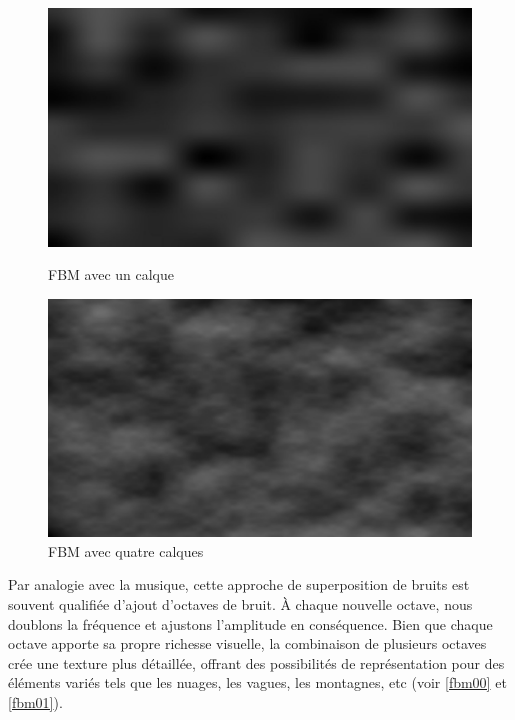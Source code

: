 \begin{figure}[h]
  \begin{minipage}[b]{0.45\linewidth}
    \centering
    \includegraphics[width=\linewidth]{images/noise/noise09.JPG}
    \caption{FBM avec un calque}
    \label{noise09}
  \end{minipage}
  \hspace{0.1\linewidth} %
  \begin{minipage}[b]{0.45\linewidth}
    \centering
    \includegraphics[width=\linewidth]{images/noise/noise08.JPG}
    \caption{FBM avec quatre calques}
    \label{noise08}
  \end{minipage}
\end{figure}


Par analogie avec la musique, cette approche de superposition de bruits est souvent qualifiée d'ajout d'octaves de bruit. À chaque nouvelle octave, nous doublons la fréquence et ajustons l'amplitude en conséquence. Bien que chaque octave apporte sa propre richesse visuelle, la combinaison de plusieurs octaves crée une texture plus détaillée, offrant des possibilités de représentation pour des éléments variés tels que les nuages, les vagues, les montagnes, etc (voir \ref{fbm00} et \ref{fbm01}).

